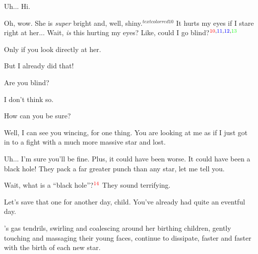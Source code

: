 \documentclass[main.tex]{subfiles}
\begin{document}
\par \Electra  Uh... Hi.

\par \Maia Oh, wow.  She is \textit{super} bright and, well, shiny.$^{textcolor{red}{10}}$  It hurts my eyes if I stare right at her... Wait, \textit{is} this hurting my eyes?  Like, could I go blind?$^{{\textcolor{red}{10},\textcolor{blue}{11},\textcolor{blue}{12},\textcolor{green}{13}}}$

\par \Pleione Only if you look directly at her.

\par \Maia But I already did that!

\par \Pleione Are you blind?

\par \Maia I don't think so.

\par \Pleione How can you be sure?

\par \Maia Well, I can see you wincing, for one thing.  You are looking at me as if I just got in to a fight with a much more massive star and lost.

\par \Pleione Uh... I'm sure you'll be fine. Plus, it could have been worse.  It could have been a black hole!  They pack a far greater punch than any star, let me tell you.

\par \Maia Wait, what is a ``black hole''?$^{\textcolor{red}{14}}$  They sound terrifying.



\par \Pleione Let's save that one for another day, child.  You've already had quite an eventful day.

\par \nar \rmpleione's gas tendrils, swirling and coalescing around her birthing children, gently touching and massaging their young faces, continue to dissipate, faster and faster with the birth of each new star.
\end{document}
